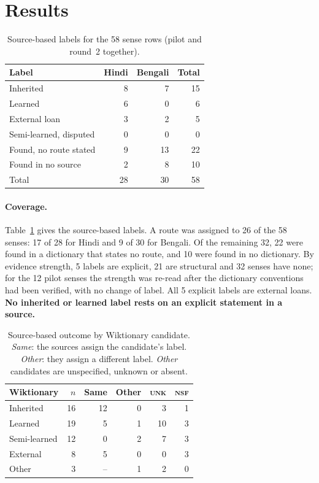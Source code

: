 \documentclass[11pt]{article}
\newcommand{\lbl}[1]{\textsc{#1}}
\begin{document}
\section{Results}

\begin{table}[t]
\centering\small
\begin{tabular}{lrrr}
\toprule
\textbf{Label} & \textbf{Hindi} & \textbf{Bengali} & \textbf{Total} \\
\midrule
Inherited & 8 & 7 & 15 \\
Learned & 6 & 0 & 6 \\
External loan & 3 & 2 & 5 \\
Semi-learned, disputed & 0 & 0 & 0 \\
\midrule
Found, no route stated & 9 & 13 & 22 \\
Found in no source & 2 & 8 & 10 \\
\midrule
Total & 28 & 30 & 58 \\
\bottomrule
\end{tabular}
\caption{Source-based labels for the 58 sense rows (pilot and round~2 together).}
\label{tab:labels}
\end{table}

\paragraph{Coverage.} Table~\ref{tab:labels} gives the source-based labels. A route was assigned to 26 of the 58 senses: 17 of 28 for Hindi and 9 of 30 for Bengali. Of the remaining 32, 22 were found in a dictionary that states no route, and 10 were found in no dictionary. By evidence strength, 5 labels are explicit, 21 are structural and 32 senses have none; for the 12 pilot senses the strength was re-read after the dictionary conventions had been verified, with no change of label. All 5 explicit labels are external loans. \textbf{No inherited or learned label rests on an explicit statement in a source.}

\begin{table}[t]
\centering\small
\begin{tabular}{lrrrrr}
\toprule
\textbf{Wiktionary} & \textbf{$n$} & \textbf{Same} & \textbf{Other} & \textbf{\lbl{unk}} & \textbf{\lbl{nsf}} \\
\midrule
Inherited & 16 & 12 & 0 & 3 & 1 \\
Learned & 19 & 5 & 1 & 10 & 3 \\
Semi-learned & 12 & 0 & 2 & 7 & 3 \\
External & 8 & 5 & 0 & 0 & 3 \\
Other & 3 & -- & 1 & 2 & 0 \\
\bottomrule
\end{tabular}
\caption{Source-based outcome by Wiktionary candidate. \textit{Same}: the sources assign the candidate's label. \textit{Other}: they assign a different label. \textit{Other} candidates are unspecified, unknown or absent.}
\label{tab:recover}
\end{table}
\end{document}
